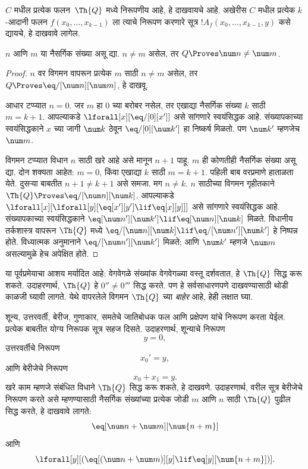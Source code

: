 \documentclass[../../../include/open-logic-section]{subfiles}
\begin{document}

$C$ मधील प्रत्येक फलन~$\Th{Q}$ मध्ये निरूपणीय आहे, हे दाखवायचे
आहे. अखेरीस $C$ मधील प्रत्येक $k$-आदानी फलन
$f(x_0,\dots,x_{k-1})$ ला त्याचे निरूपण करणारे सूत्र
$!A_f(x_0,\dots,x_{k-1},y)$ कसे द्यायचे, हे दाखवावे लागेल.

\begin{lem}
$n$ आणि $m$ या नैसर्गिक संख्या असू द्या. $n \neq m$ असेल,
तर $Q \Proves \num n \neq \num m$.
\end{lem}

\begin{proof}
$n$ वर विगमन वापरून प्रत्येक $m$ साठी $n \neq m$ असेल, तर
$Q \Proves \eq/[\num n][\num m]$, हे दाखवू.

आधार टप्प्यात $n = 0$. जर $m$ हा $0$ च्या बरोबर नसेल,
तर एखाद्या नैसर्गिक संख्या $k$ साठी $m = k +
1$. आपल्याकडे $\lforall[x][\eq/[0][x']]$ असे सांगणारे स्वयंसिद्धक
आहे. संख्यापकाच्या स्वयंसिद्धकाने $x$ च्या जागी
$\num k$ ठेवून $\eq/[0][\num k']$ हा निष्कर्ष मिळतो. पण
$\num k'$ म्हणजेच $\num m$.

विगमन टप्प्यात विधान $n$ साठी खरे आहे असे मानून $n+1$
पाहू. $m$ ही कोणतीही नैसर्गिक संख्या असू द्या. दोन शक्यता आहेत:
$m = 0$, किंवा एखाद्या $k$ साठी $m = k+1$. पहिली बाब
वरप्रमाणे हाताळता येते. दुसऱ्या बाबतीत $n+1 \neq
k+1$ असे समजा. मग $n \neq k$. $n$ साठीच्या विगमन गृहीतकाने
$\Th{Q} \Proves \eq/[\num n][\num k]$. आपल्याकडे
$\lforall[x][\lforall[y][\eq[x'][y'] \lif \eq[x][y]]]$
असे सांगणारे स्वयंसिद्धक आहे. संख्यापकाच्या स्वयंसिद्धकाने
$\eq[\num n'][\num k'] \lif \eq[\num n][\num
  k]$ मिळते. विधानीय तर्कशास्त्र वापरून $\Th{Q}$ मध्ये
$\eq/[\num n][\num k] \lif \eq/[\num n'][\num k']$
हे निष्पन्न होते. विध्यात्मक अनुमानाने
$\eq/[\num n'][\num k']$ मिळते; आणि $\num k'$ म्हणजे
$\num m$ असल्यामुळे हेच अपेक्षित होते.
\end{proof}

या पूर्वप्रमेयाचा आशय मर्यादित आहे: वेगवेगळे संख्यांक
वेगवेगळ्या वस्तू दर्शवतात, हे $\Th{Q}$ सिद्ध करू शकते. उदाहरणार्थ,
$\Th{Q}$ हे $0'' \neq 0'''$ सिद्ध करते. पण हे सर्वसाधारणपणे
दाखवण्यासाठी थोडी काळजी घ्यावी लागते. येथे वापरलेले विगमन
$\Th{Q}$ च्या \emph{बाहेर} आहे, हेही लक्षात घ्या.

शून्य, उत्तरवर्ती, बेरीज, गुणाकार, समतेचे जातिबोधक फल
आणि प्रक्षेपण यांचे निरूपण करता येईल. प्रत्येक बाबतीत योग्य
निरूपक सूत्र सहज दिसते. उदाहरणार्थ, शून्याचे निरूपण
\[
y = 0,
\]
उत्तरवर्तीचे निरूपण
\[
x_0' = y,
\]
आणि बेरीजेचे निरूपण
\[
x_0 + x_1 = y.
\]
खरे काम म्हणजे संबंधित विधाने $\Th{Q}$ सिद्ध करू शकते, हे
दाखवणे. उदाहरणार्थ, वरील सूत्र बेरीजेचे निरूपण करते असे
म्हणण्यासाठी नैसर्गिक संख्यांच्या प्रत्येक जोडी $m$ आणि $n$
साठी $\Th{Q}$ पुढील सिद्ध करते, हे दाखवावे लागते:
\[
\eq[\num n + \num m][\num {n+m}]
\]
आणि
\[
\lforall[y][(\eq[(\num n + \num m)][y] \lif \eq[y][\num {n+m}])].
\]
\end{document}
